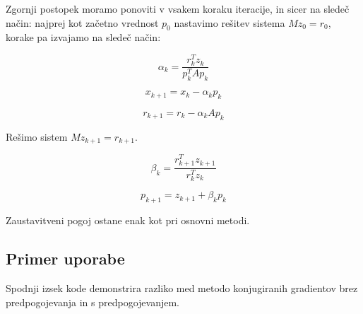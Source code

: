 \documentclass[12pt,a4paper]{article}
\begin{document}
Zgornji postopek moramo ponoviti v vsakem koraku iteracije, in sicer na sledeč način: najprej kot začetno vrednost $p_0$ nastavimo rešitev sistema $Mz_0=r_0$, korake pa izvajamo na sledeč način:


\[
\alpha_k=\frac{r_k^Tz_k}{p_k^TAp_k}
\]

\[
x_{k+1}=x_k-\alpha_kp_k
\]

\[
r_{k+1}=r_k-\alpha_kAp_k
\]

Rešimo sistem $Mz_{k+1}=r_{k+1}$.


\[
\beta_k=\frac{r_{k+1}^Tz_{k+1}}{r_k^Tz_k}
\]

\[
p_{k+1}=z_{k+1}+\beta_kp_k
\]

Zaustavitveni pogoj ostane enak kot pri osnovni metodi.


\subsection{Primer uporabe}
Spodnji izsek kode demonstrira razliko med metodo konjugiranih gradientov brez predpogojevanja in s predpogojevanjem. 
\end{document}

